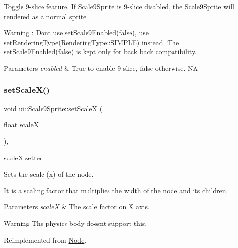 Toggle 9-\/slice feature. If \hyperlink{classui_1_1Scale9Sprite}{Scale9\+Sprite} is 9-\/slice disabled, the \hyperlink{classui_1_1Scale9Sprite}{Scale9\+Sprite} will rendered as a normal sprite. 

\begin{DoxyWarning}{Warning}
\+: Don\textquotesingle{}t use set\+Scale9\+Enabled(false), use set\+Rendering\+Type(\+Rendering\+Type\+::\+S\+I\+M\+P\+L\+E) instead. The set\+Scale9\+Enabled(false) is kept only for back back compatibility. 
\end{DoxyWarning}

\begin{DoxyParams}{Parameters}
{\em enabled} & True to enable 9-\/slice, false otherwise.  NA \\
\hline
\end{DoxyParams}
\mbox{\label{classui_1_1Scale9Sprite_a7f9db0e954aca485c0d37a665927881c}} 
\subsubsection{\texorpdfstring{set\+Scale\+X()}{setScaleX()}}
{\footnotesize\ttfamily void ui\+::\+Scale9\+Sprite\+::set\+ScaleX (\begin{DoxyParamCaption}\item[{float}]{scaleX }\end{DoxyParamCaption})\hspace{0.3cm}{\ttfamily [override]}, {\ttfamily [virtual]}}



scaleX setter 

Sets the scale (x) of the node.

It is a scaling factor that multiplies the width of the node and its children.


\begin{DoxyParams}{Parameters}
{\em scaleX} & The scale factor on X axis.\\
\hline
\end{DoxyParams}
\begin{DoxyWarning}{Warning}
The physics body doesn\textquotesingle{}t support this. 
\end{DoxyWarning}


Reimplemented from \hyperlink{classNode_acf7f04074f7f49972e152788c090b877}{Node}.

